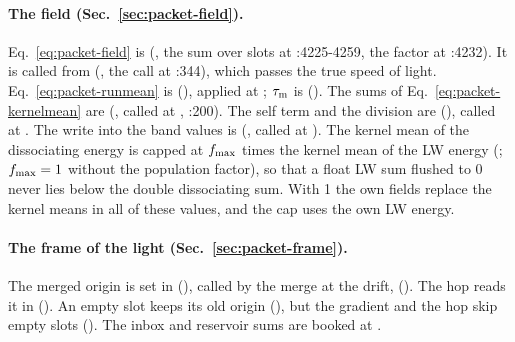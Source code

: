 \paragraph{The field (Sec.~\ref{sec:packet-field}).}
Eq.~\eqref{eq:packet-field} is 
(, the sum over slots at :4225-4259, the
factor at :4232). It is called from 
(, the call at :344), which passes the true
speed of light. Eq.~\eqref{eq:packet-runmean} is
 (),
applied at ; $\tau_{\rm m}$ is
(). The sums of
Eq.~\eqref{eq:packet-kernelmean} are 
(, called at
, :200). The self term and the
division are 
(), called at .
The write into the band values is 
(, called at ).
The kernel mean of the dissociating energy is capped at $f_{\rm max}$ times the
kernel mean of the LW energy (; $f_{\rm max}=1$
without the population factor), so that a float LW sum flushed to 0 never lies
below the double dissociating sum. With  1
the own fields replace the kernel means in all of these values, and the cap uses the own LW energy.

\paragraph{The frame of the light (Sec.~\ref{sec:packet-frame}).} The merged
origin is set in 
(), called by the merge at the drift,
 ().
The hop reads it in 
(). An empty slot keeps its old origin
(), but the gradient and the hop skip empty
slots (). The inbox and reservoir sums are
booked at .

